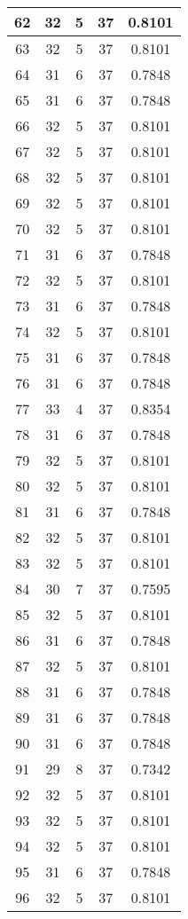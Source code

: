 \documentclass[letterpaper, 12pt]{article}
\begin{document}
\begin{longtable}{|c|c|c|c|c|}
\hline
62 & 32 & 5 & 37 & 0.8101 \\
\hline
63 & 32 & 5 & 37 & 0.8101 \\
\hline
64 & 31 & 6 & 37 & 0.7848 \\
\hline
65 & 31 & 6 & 37 & 0.7848 \\
\hline
66 & 32 & 5 & 37 & 0.8101 \\
\hline
67 & 32 & 5 & 37 & 0.8101 \\
\hline
68 & 32 & 5 & 37 & 0.8101 \\
\hline
69 & 32 & 5 & 37 & 0.8101 \\
\hline
70 & 32 & 5 & 37 & 0.8101 \\
\hline
71 & 31 & 6 & 37 & 0.7848 \\
\hline
72 & 32 & 5 & 37 & 0.8101 \\
\hline
73 & 31 & 6 & 37 & 0.7848 \\
\hline
74 & 32 & 5 & 37 & 0.8101 \\
\hline
75 & 31 & 6 & 37 & 0.7848 \\
\hline
76 & 31 & 6 & 37 & 0.7848 \\
\hline
77 & 33 & 4 & 37 & 0.8354 \\
\hline
78 & 31 & 6 & 37 & 0.7848 \\
\hline
79 & 32 & 5 & 37 & 0.8101 \\
\hline
80 & 32 & 5 & 37 & 0.8101 \\
\hline
81 & 31 & 6 & 37 & 0.7848 \\
\hline
82 & 32 & 5 & 37 & 0.8101 \\
\hline
83 & 32 & 5 & 37 & 0.8101 \\
\hline
84 & 30 & 7 & 37 & 0.7595 \\
\hline
85 & 32 & 5 & 37 & 0.8101 \\
\hline
86 & 31 & 6 & 37 & 0.7848 \\
\hline
87 & 32 & 5 & 37 & 0.8101 \\
\hline
88 & 31 & 6 & 37 & 0.7848 \\
\hline
89 & 31 & 6 & 37 & 0.7848 \\
\hline
90 & 31 & 6 & 37 & 0.7848 \\
\hline
91 & 29 & 8 & 37 & 0.7342 \\
\hline
92 & 32 & 5 & 37 & 0.8101 \\
\hline
93 & 32 & 5 & 37 & 0.8101 \\
\hline
94 & 32 & 5 & 37 & 0.8101 \\
\hline
95 & 31 & 6 & 37 & 0.7848 \\
\hline
96 & 32 & 5 & 37 & 0.8101 \\

\end{longtable}
\end{document}
